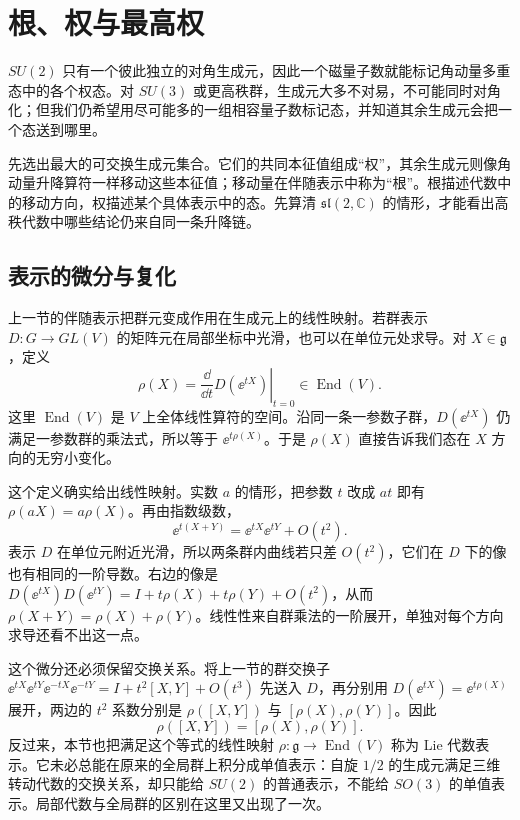 \section{根、权与最高权}
\label{chap:roots-weights}

$SU(2)$ 只有一个彼此独立的对角生成元，因此一个磁量子数就能标记角动量多重态中的各个权态。对 $SU(3)$ 或更高秩群，生成元大多不对易，不可能同时对角化；但我们仍希望用尽可能多的一组相容量子数标记态，并知道其余生成元会把一个态送到哪里。

先选出最大的可交换生成元集合。它们的共同本征值组成“权”，其余生成元则像角动量升降算符一样移动这些本征值；移动量在伴随表示中称为“根”。根描述代数中的移动方向，权描述某个具体表示中的态。先算清 \(\mathfrak{sl}(2,\mathbb C)\) 的情形，才能看出高秩代数中哪些结论仍来自同一条升降链。

\subsection{表示的微分与复化}

上一节的伴随表示把群元变成作用在生成元上的线性映射。若群表示 $D:G\to GL(V)$ 的矩阵元在局部坐标中光滑，也可以在单位元处求导。对 $X\in\mathfrak g$，定义
\begin{equation}
\rho(X)=\left.\frac{\dd}{\dd t}D(\ee^{tX})\right|_{t=0}\in\operatorname{End}(V).
\label{eq:derived-lie-representation}
\end{equation}
这里 $\operatorname{End}(V)$ 是 $V$ 上全体线性算符的空间。沿同一条一参数子群，$D(\ee^{tX})$ 仍满足一参数群的乘法式，所以等于 $\ee^{t\rho(X)}$。于是 $\rho(X)$ 直接告诉我们态在 $X$ 方向的无穷小变化。

这个定义确实给出线性映射。实数 $a$ 的情形，把参数 $t$ 改成 $at$ 即有 $\rho(aX)=a\rho(X)$。再由指数级数，
\[
\ee^{t(X+Y)}=\ee^{tX}\ee^{tY}+O(t^2).
\]
表示 $D$ 在单位元附近光滑，所以两条群内曲线若只差 $O(t^2)$，它们在 $D$ 下的像也有相同的一阶导数。右边的像是 $D(\ee^{tX})D(\ee^{tY})=I+t\rho(X)+t\rho(Y)+O(t^2)$，从而 $\rho(X+Y)=\rho(X)+\rho(Y)$。线性性来自群乘法的一阶展开，单独对每个方向求导还看不出这一点。

这个微分还必须保留交换关系。将上一节的群交换子
$\ee^{tX}\ee^{tY}\ee^{-tX}\ee^{-tY}=I+t^2[X,Y]+O(t^3)$
先送入 $D$，再分别用 $D(\ee^{tX})=\ee^{t\rho(X)}$ 展开，两边的 $t^2$ 系数分别是 $\rho([X,Y])$ 与 $[\rho(X),\rho(Y)]$。因此
\begin{equation}
\rho([X,Y])=[\rho(X),\rho(Y)].
\label{eq:lie-representation-bracket}
\end{equation}
反过来，本节也把满足这个等式的线性映射 $\rho:\mathfrak g\to\operatorname{End}(V)$ 称为 Lie 代数表示。它未必总能在原来的全局群上积分成单值表示：自旋 $1/2$ 的生成元满足三维转动代数的交换关系，却只能给 $SU(2)$ 的普通表示，不能给 $SO(3)$ 的单值表示。局部代数与全局群的区别在这里又出现了一次。

